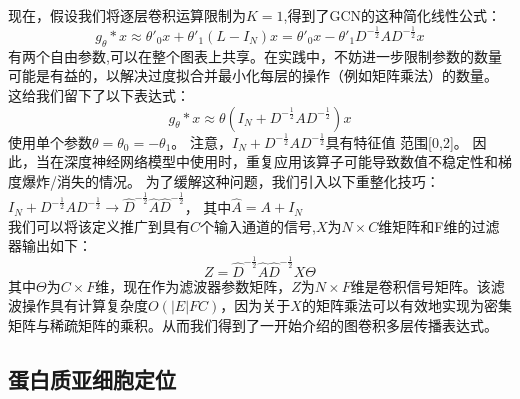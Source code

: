 \documentclass[a4paper,UTF8]{article}
\begin{document}
现在，假设我们将逐层卷积运算限制为$K = 1$,得到了GCN的这种简化线性公式：
$$g_\theta \ast x \approx \theta'_0x + \theta'_1(L-I_N)x=\theta'_0x-\theta'_1{D}^{-\frac{1}{2}} {A} {D}^{-\frac{1}{2}} x$$
有两个自由参数,可以在整个图表上共享。在实践中，不妨进一步限制参数的数量可能是有益的，以解决过度拟合并最小化每层的操作（例如矩阵乘法）的数量。 这给我们留下了以下表达式：
$$g_\theta \ast x \approx \theta \left(I_N+{D}^{-\frac{1}{2}} {A} {D}^{-\frac{1}{2}} \right)x$$
使用单个参数$\theta=\theta_0=-\theta_1$。 注意，$I_N+{D}^{-\frac{1}{2}} {A} {D}^{-\frac{1}{2}}$具有特征值
范围[0,2]。 因此，当在深度神经网络模型中使用时，重复应用该算子可能导致数值不稳定性和梯度爆炸/消失的情况。 为了缓解这种问题，我们引入以下重整化技巧：$I_N+{D}^{-\frac{1}{2}} {A} {D}^{-\frac{1}{2}} \rightarrow \hat{D}^{-\frac{1}{2}} \hat{A} \hat{D}^{-\frac{1}{2}}$， 其中$\hat{A}= A + I_N$\\

我们可以将该定义推广到具有$C$个输入通道的信号,$X$为$N×C$维矩阵和F维的过滤器输出如下：
$$Z = \hat{D}^{-\frac{1}{2}} \hat{A} \hat{D}^{-\frac{1}{2}} X \Theta $$
其中$\Theta $为$C×F$维，现在作为滤波器参数矩阵，$Z$为$N×F$维是卷积信号矩阵。该滤波操作具有计算复杂度$O(\vert E \vert FC)$，因为关于$X$的矩阵乘法可以有效地实现为密集矩阵与稀疏矩阵的乘积。从而我们得到了一开始介绍的图卷积多层传播表达式。

\subsection{蛋白质亚细胞定位}
\end{document}
